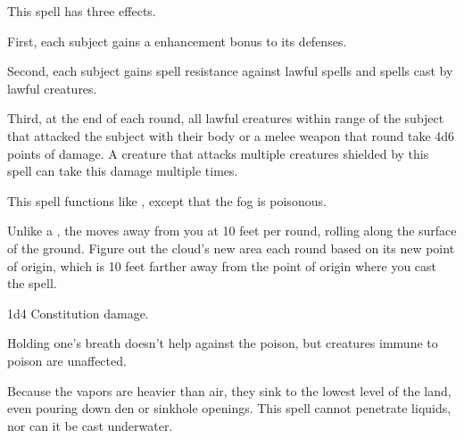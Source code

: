 \spelldur{\durshort \dismissable}
\begin{spelleffect}
    This spell has three effects.
    \par First, each subject gains a  enhancement bonus to its defenses.
    \par Second, each subject gains spell resistance against lawful spells and spells cast by lawful creatures.
    \par Third, at the end of each round, all lawful creatures within \rngclose range of the subject that attacked the subject with their body or a melee weapon that round take 4d6 points of damage. A creature that attacks multiple creatures shielded by this spell can take this damage multiple times.
\end{spelleffect}

\begin{spelleffect}
    This spell functions like , except that the fog is poisonous.
    \par Unlike a , the  moves away from you at 10 feet per round, rolling along the surface of the ground. Figure out the cloud's new area each round based on its new point of origin, which is 10 feet farther away from the point of origin where you cast the spell.
\end{spelleffect}
\begin{spellsuccess}
    1d4 Constitution damage.
\end{spellsuccess}
\begin{spellnotes}
    Holding one's breath doesn't help against the poison, but creatures immune to poison are unaffected.
    \par Because the vapors are heavier than air, they sink to the lowest level of the land, even pouring down den or sinkhole openings. This spell cannot penetrate liquids, nor can it be cast underwater.
\end{spellnotes}

